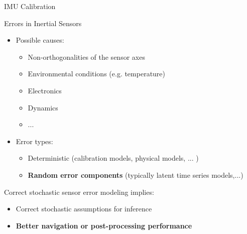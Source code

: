 \documentclass[envcountsect,usenames,dvipsnames]{beamer}
\theoremstyle{mystyle}
\begin{document}
\begin{frame}{IMU Calibration}
	\begin{block}{Errors in Inertial Sensors}
		\begin{itemize}
			\item Possible causes:
			\begin{itemize}
				\item Non-orthogonalities of the sensor axes
				\item Environmental conditions (e.g. temperature)
				\item Electronics
				\item Dynamics
				\item ...
			\end{itemize}
			\item Error types:
			\begin{itemize}
				\item Deterministic (calibration models, physical models, ... )
				\item \textbf{{\color{beamer@UIUCblue}Random error components}} (typically latent time series models,...)
			\end{itemize}
		\end{itemize}
	\end{block}
	
	\begin{block}{Correct stochastic sensor error modeling implies:}
	\begin{itemize}
		\item  Correct stochastic assumptions for inference
		 \item \textbf{{\color{beamer@UIUCblue}Better navigation or post-processing performance}}
	\end{itemize}
\end{block}
\end{frame}
\end{document}
